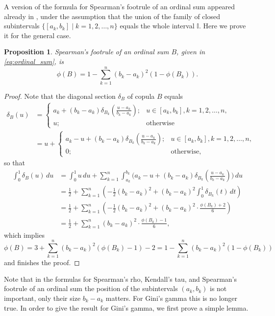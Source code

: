 \documentclass[12pt,a4paper]{amsart}
\newtheorem{proposition}[theorem]{Proposition}
\theoremstyle{definition}
\newcommand{\II}{\mathbb{I}}
\begin{document}
A version of the formula for Spearman's footrule of an ordinal sum appeared already in \cite{TsScTr}, under the assumption that the union of the family of closed subintervals $\{[a_k, b_k] \mid k=1,2, \ldots, n\}$ equals the whole interval $\II$. Here we prove it for the general case. 

\begin{proposition}\label{prop:ordinal-phi}
   Spearman's footrule of an ordinal sum $B$, given in \eqref{eq:ordinal_sum}, is
    \begin{equation} \label{eq:ordinal-phi}
        \phi(B) =  1 - \sum_{k=1}^n (b_k-a_k)^2(1-\phi(B_k)). 
    \end{equation}  
\end{proposition}

\begin{proof}
Note that the diagonal section $\delta_B$ of copula $B$ equals
\begin{align*}
\delta_B(u) &= \begin{cases}
		a_k + (b_k-a_k)\delta_{B_k}(\frac{u-a_k}{b_k-a_k}); & u \in [a_k, b_k], k=1, 2, \dots, n,\\
		u; & \text{otherwise} 
    \end{cases} \\
    &= u + \begin{cases}
		a_k - u + (b_k-a_k)\delta_{B_k}(\frac{u-a_k}{b_k-a_k}); & u \in [a_k, b_k], k=1, 2, \dots, n,\\
		0; & \text{otherwise},
    \end{cases}
\end{align*}
so that 
\begin{align*}
\int_0^1 \delta_B(u) \, du &= \int_0^1 u \, du + \sum_{k=1}^n\int_{a_k}^{b_k}
		\big(a_k - u + (b_k-a_k)\delta_{B_k}(\tfrac{u-a_k}{b_k-a_k})\big) \, du\\
    &= \tfrac12 + \sum_{k=1}^n\left(-\tfrac12(b_k-a_k)^2 + (b_k-a_k)^2\int_0^1 \delta_{B_k}(t) \, dt\right) \\
    &= \tfrac12 + \sum_{k=1}^n\left(-\tfrac12(b_k-a_k)^2 + (b_k-a_k)^2 \cdot\frac{\phi(B_k)+2}{6}\right) \\    
    &= \tfrac12 + \sum_{k=1}^n(b_k-a_k)^2\cdot\frac{\phi(B_k)-1}{6} ,
\end{align*}
which implies
$$\phi(B) = 3 + \sum_{k=1}^n(b_k-a_k)^2(\phi(B_k)-1) - 2 = 1 - \sum_{k=1}^n (b_k-a_k)^2(1-\phi(B_k))$$
and finishes the proof.
\end{proof}

Note that in the formulas for Spearman's rho, Kendall's tau, and Spearman's footrule of an ordinal sum the position of the subintervals $(a_k, b_k)$ is not important, only their size $b_k - a_k$ matters. For Gini's gamma this is no longer true. In order to give the result for Gini's gamma, we first prove a simple lemma. 
\end{document}
